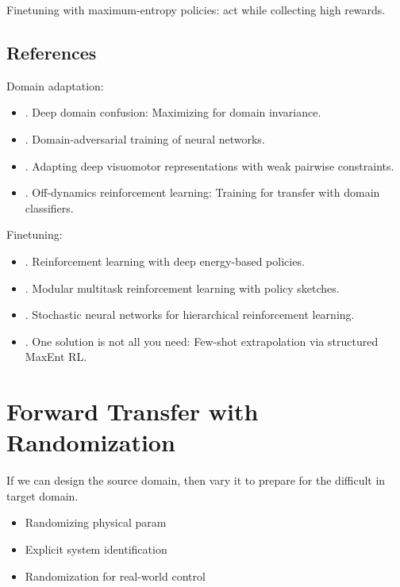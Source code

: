 Finetuning with maximum-entropy policies: act  while collecting high rewards. \cite{haarnoja2017reinforcement}

\subsection{References}
Domain adaptation:
\begin{itemize}
	\item {}. Deep domain confusion: Maximizing for domain invariance.
	\item {}. Domain-adversarial training of neural networks.
	\item {}. Adapting deep visuomotor representations with weak pairwise constraints.
	\item {}. Off-dynamics reinforcement learning: Training for transfer with domain classifiers.
\end{itemize}

Finetuning:
\begin{itemize}
	\item {}. Reinforcement learning with deep energy-based policies.
	\item {}. Modular multitask reinforcement learning with policy sketches.
	\item {}. Stochastic neural networks for hierarchical reinforcement learning.
	\item {}. One solution is not all you need: Few-shot extrapolation via structured \ac{MaxEnt} \ac{RL}.
\end{itemize}

\section{Forward Transfer with Randomization}
 If we can design the source domain, then vary it to prepare for the difficult in target domain.

\begin{itemize}
	\item Randomizing physical \ac{param} \cite{rajeswaran2016epopt}
	\item Explicit system identification \cite{yu2017preparing}
	\item Randomization for real-world control \cite{sadeghi2016cad2rl}
\end{itemize}

